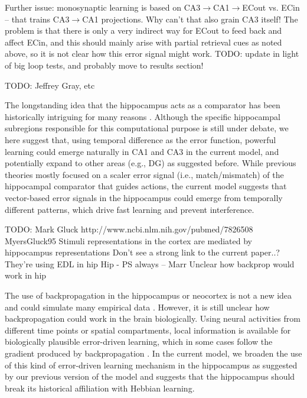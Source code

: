\documentclass[11pt,twoside]{article}
\newif\myifpdf
\begin{document}
Further issue: monosynaptic learning is based on CA3$\rightarrow$CA1$\rightarrow$ECout vs. ECin -- that trains CA3$\rightarrow$CA1 projections.  Why can't that also grain CA3 itself!  The problem is that there is only a very indirect way for ECout to feed back and affect ECin, and this should mainly arise with partial retrieval cues as noted above, so it is not clear how this error signal might work.  TODO: update in light of big loop tests, and probably move to results section!

TODO: Jeffrey Gray, etc

The longstanding idea that the hippocampus acts as a comparator has been historically intriguing for many reasons \citep{Gray82,Vinogradova01,LismanGrace05}.  Although the specific hippocampal subregions responsible for this computational purpose is still under debate, we here suggest that, using temporal difference as the error function, powerful learning could emerge naturally in CA1 \citep{KetzMorkondaOReilly13} and CA3 in the current model, and potentially expand to other areas (e.g., DG) as suggested before.  While previous theories mostly focused on a scaler error signal (i.e., match/mismatch) of the hippocampal comparator that guides actions, the current model suggests that vector-based error signals in the hippocampus could emerge from temporally different patterns, which drive fast learning and prevent interference. 

TODO: Mark Gluck  http://www.ncbi.nlm.nih.gov/pubmed/7826508  MyersGluck95
Stimuli representations in the cortex are mediated by hippocampus representations
Don't see a strong link to the current paper..?
They're using EDL in hip
Hip - PS always -- Marr
Unclear how backprop would work in hip

The use of backpropagation in the hippocampus or neocortex is not a new idea and could simulate many empirical data \citep{MyersGluck95}.  However, it is still unclear how backpropagation could work in the brain biologically.  Using neural activities from different time points or spatial compartments, local information is available for biologically plausible error-driven learning, which in some cases follow the gradient produced by backpropagation \citep{LillicrapSantoroMarrisEtAl20}.  In the current model, we broaden the use of this kind of error-driven learning mechanism in the hippocampus as suggested by our previous version of the model \citep{KetzMorkondaOReilly13} and suggests that the hippocampus should break its historical affiliation with Hebbian learning. 
\end{document}
